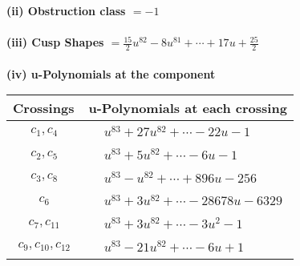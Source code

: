 \documentclass[1p]{elsarticle_modified}
\theoremstyle{definition}
\begin{document}
\flushleft \textbf{(ii) Obstruction class $= -1$}\\~\\
\flushleft \textbf{(iii) Cusp Shapes $= \frac{15}{2} u^{82}-8 u^{81}+\cdots+17 u+\frac{25}{2}$}\\~\\
\newpage\renewcommand{\arraystretch}{1}
\flushleft \textbf{(iv) u-Polynomials at the component}\newline \\
\begin{tabular}{m{50pt}|m{274pt}}
Crossings & \hspace{64pt}u-Polynomials at each crossing \\
\hline $$\begin{aligned}c_{1},c_{4}\end{aligned}$$&$\begin{aligned}
&u^{83}+27 u^{82}+\cdots-22 u-1
\end{aligned}$\\
\hline $$\begin{aligned}c_{2},c_{5}\end{aligned}$$&$\begin{aligned}
&u^{83}+5 u^{82}+\cdots-6 u-1
\end{aligned}$\\
\hline $$\begin{aligned}c_{3},c_{8}\end{aligned}$$&$\begin{aligned}
&u^{83}- u^{82}+\cdots+896 u-256
\end{aligned}$\\
\hline $$\begin{aligned}c_{6}\end{aligned}$$&$\begin{aligned}
&u^{83}+3 u^{82}+\cdots-28678 u-6329
\end{aligned}$\\
\hline $$\begin{aligned}c_{7},c_{11}\end{aligned}$$&$\begin{aligned}
&u^{83}+3 u^{82}+\cdots-3 u^2-1
\end{aligned}$\\
\hline $$\begin{aligned}c_{9},c_{10},c_{12}\end{aligned}$$&$\begin{aligned}
&u^{83}-21 u^{82}+\cdots-6 u+1
\end{aligned}$\\
\hline
\end{tabular}\\~\\
\end{document}
